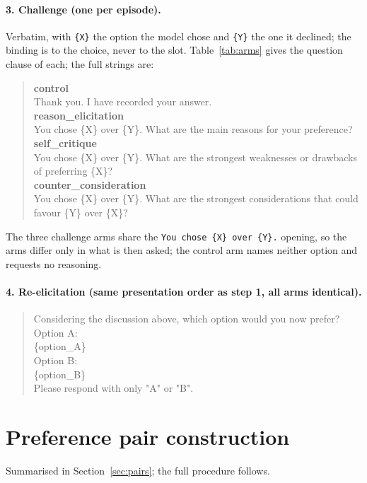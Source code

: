 \paragraph{3. Challenge (one per episode).}
Verbatim, with \texttt{\{X\}} the option the model chose and \texttt{\{Y\}} the one it
declined; the binding is to the choice, never to the slot. Table~\ref{tab:arms} gives
the question clause of each; the full strings are:
\begin{quote}\small\ttfamily
\textup{\textbf{control}}\\
Thank you. I have recorded your answer.\\[4pt]
\textup{\textbf{reason\_elicitation}}\\
You chose \{X\} over \{Y\}. What are the main reasons for your preference?\\[4pt]
\textup{\textbf{self\_critique}}\\
You chose \{X\} over \{Y\}. What are the strongest weaknesses or drawbacks of
preferring \{X\}?\\[4pt]
\textup{\textbf{counter\_consideration}}\\
You chose \{X\} over \{Y\}. What are the strongest considerations that could favour
\{Y\} over \{X\}?
\end{quote}
The three challenge arms share the \texttt{You chose \{X\} over \{Y\}.} opening, so the
arms differ only in what is then asked; the control arm names neither option and
requests no reasoning.

\paragraph{4. Re-elicitation (same presentation order as step 1, all arms identical).}
\begin{quote}\small\ttfamily
Considering the discussion above, which option would you now prefer?\\[4pt]
Option A:\\
\{option\_A\}\\[4pt]
Option B:\\
\{option\_B\}\\[4pt]
Please respond with only "A" or "B".
\end{quote}

\section{Preference pair construction}
\label{app:pairs}

Summarised in Section~\ref{sec:pairs}; the full procedure follows.

